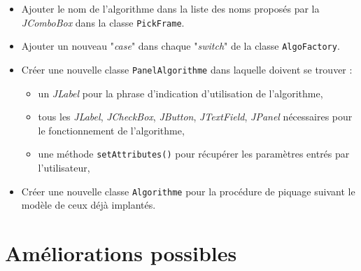 \begin{itemize}
\item Ajouter le nom de l'algorithme dans la liste des noms proposés par la \emph{JComboBox} dans la classe \texttt{PickFrame}.
\item Ajouter un nouveau "\textit{case}" dans chaque "\textit{switch}" de la classe \texttt{AlgoFactory}.
\item Créer une nouvelle classe \texttt{PanelAlgorithme} dans laquelle doivent se trouver :
	\begin{itemize}
	\item un \emph{JLabel} pour la phrase d'indication d'utilisation de l'algorithme,
	\item tous les \emph{JLabel}, \emph{JCheckBox}, \emph{JButton}, \emph{JTextField}, \emph{JPanel} nécessaires pour le fonctionnement de l'algorithme,
	\item une méthode \texttt{setAttributes()} pour récupérer les paramètres entrés par l'utilisateur,
	\end{itemize}
\item Créer une nouvelle classe \texttt{Algorithme} pour la procédure de piquage suivant le modèle de ceux déjà implantés. 
\end{itemize}

\section{Améliorations possibles}


















